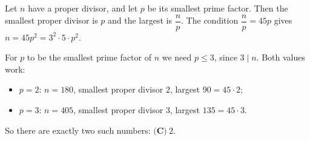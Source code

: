 Let $n$ have a proper divisor, and let $p$ be its smallest prime factor. Then the smallest proper divisor is $p$ and the largest is $\dfrac {n}{p}$. The condition $\dfrac {n}{p}=45p$ gives $n=45p^2=3^2\cdot5\cdot p^2$.

For $p$ to be the smallest prime factor of $n$ we need $p\le3$, since $3\mid n$. Both values work:
\begin{itemize}
\item $p=2$: $n=180$, smallest proper divisor $2$, largest $90=45\cdot2$;
\item $p=3$: $n=405$, smallest proper divisor $3$, largest $135=45\cdot3$.
\end{itemize}
So there are exactly two such numbers: $\boxed{\textbf{(C)}\ 2}$.

